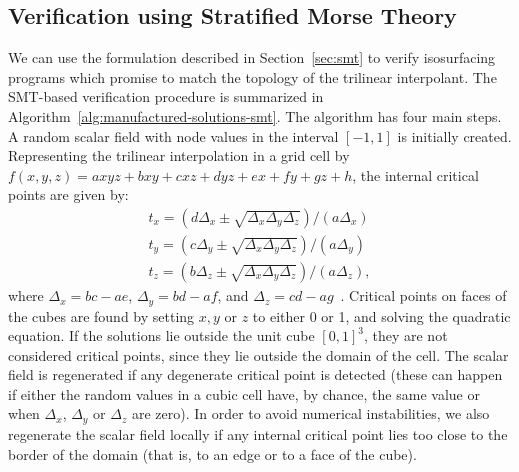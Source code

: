\subsection{Verification using Stratified Morse Theory}
\label{subsec:smt-verify}

We can use the formulation described in Section~\ref{sec:smt} to
verify isosurfacing programs which promise to match the
topology of the trilinear interpolant.
The SMT-based verification procedure is summarized in
Algorithm~\ref{alg:manufactured-solutions-smt}. The algorithm 
has four main steps. A random scalar field with node values in the
interval $[-1,1]$ is initially created. Representing the trilinear
interpolation in a grid cell by $f(x,y,z) = axyz + bxy + cxz + dyz + ex + fy + gz + h$,
the internal critical points are given by:
\[\begin{array}{ccc}
t_x = (d \Delta_x \pm \sqrt{\Delta_x \Delta_y \Delta_z})/({a \Delta_x})\\
t_y = (c \Delta_y \pm \sqrt{\Delta_x \Delta_y \Delta_z})/({a \Delta_y})\\
t_z = (b \Delta_z \pm \sqrt{\Delta_x \Delta_y \Delta_z})/({a \Delta_z}),
\end{array}\]
\noindent where $\Delta_x = bc-ae$, $\Delta_y = bd-af$, and $\Delta_z
= cd-ag$~\cite{Pascucci03}.  Critical points on faces of the cubes are found by setting
$x,y$ or $z$ to either 0 or 1, and solving
the quadratic equation.  
If the solutions lie outside the unit cube $[0, 1]^3$, they are not
considered critical points, since they lie outside the domain of the cell. The scalar field
is regenerated if any degenerate critical point is detected (these
can happen if either the random values in a cubic cell have, by chance, the same value or when 
$\Delta_x$, $\Delta_y$ or $\Delta_z$ are zero). In order
to avoid numerical instabilities, we also regenerate the scalar field
locally if any internal critical point lies too close to the border of
the domain (that is, to an edge or to a face of the cube).

